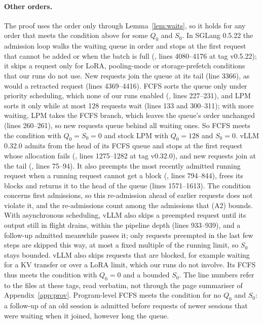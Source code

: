 \paragraph{Other orders.} The proof uses the order only through Lemma~\ref{lem:waits}, so it holds for any order that meets the condition above for some $Q_0$ and $S_0$. In SGLang 0.5.22 the admission loop walks the waiting queue in order and stops at the first request that cannot be added or when the batch is full (, lines 4080--4176 at tag v0.5.22); it skips a request only for LoRA, pooling-mode or storage-prefetch conditions that our runs do not use. New requests join the queue at its tail (line 3366), as would a retracted request (lines 4369--4416). FCFS sorts the queue only under priority scheduling, which none of our runs enabled (, lines 227--231), and LPM sorts it only while at most 128 requests wait (lines 133 and 300--311); with more waiting, LPM takes the FCFS branch, which leaves the queue's order unchanged (lines 260--261), so new requests queue behind all waiting ones. So FCFS meets the condition with $Q_0=S_0=0$ and stock LPM with $Q_0=128$ and $S_0=0$. vLLM 0.32.0 admits from the head of its FCFS queue and stops at the first request whose allocation fails (, lines 1275--1282 at tag v0.32.0), and new requests join at the tail (, lines 75--94). It also preempts the most recently admitted running request when a running request cannot get a block (, lines 794--844), frees its blocks and returns it to the head of the queue (lines 1571--1613). The condition concerns first admissions, so this re-admission ahead of earlier requests does not violate it, and the re-admissions count among the admissions that (A2) bounds. With asynchronous scheduling, vLLM also skips a preempted request until its output still in flight drains, within the pipeline depth (lines 933--939), and a follow-up admitted meanwhile passes it; only requests preempted in the last few steps are skipped this way, at most a fixed multiple of the running limit, so $S_0$ stays bounded. vLLM also skips requests that are blocked, for example waiting for a KV transfer or over a LoRA limit, which our runs do not involve. Its FCFS thus meets the condition with $Q_0=0$ and a bounded $S_0$. The line numbers refer to the files at these tags, read verbatim, not through the page summariser of Appendix~\ref{app:prov}. Program-level FCFS meets the condition for no $Q_0$ and $S_0$: a follow-up of an old session is admitted before requests of newer sessions that were waiting when it joined, however long the queue.

